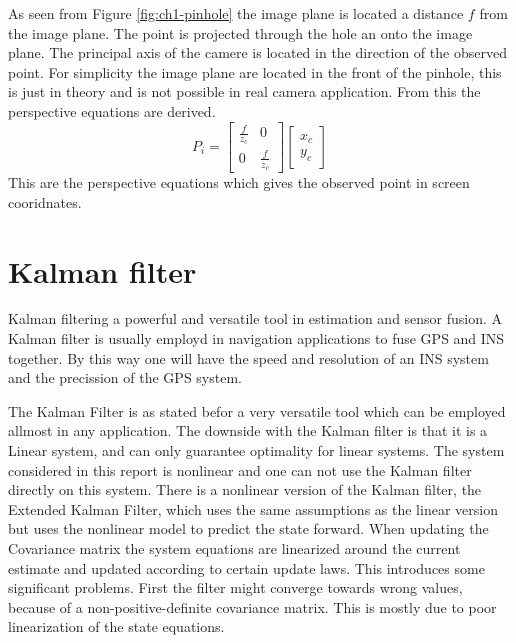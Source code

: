 	As seen from Figure \ref{fig:ch1-pinhole} the image plane is located a distance $f$ from the image plane. 
	The point is projected through the hole an onto the image plane. The principal axis of the camere is located
	in the direction of the observed point. For simplicity the image plane are located in the front of the
	pinhole, this is just in theory and is not possible in real camera application. From this the
	perspective equations are derived. \cite{robotbok}
	\begin{equation}
		\label{eq:ch1-perspective}
		P_i = \left[ \begin{array}{cc}
					\frac{f}{z_c} & 0 \\
					0	& \frac{f}{z_c} 
				\end{array} \right] 
				\left[ \begin{array}{c}
					x_c \\
					y_c
					\end{array} \right]
	\end{equation}
	This are the perspective equations which gives the observed point in screen cooridnates. 

\section{Kalman filter}
	Kalman filtering a powerful and versatile tool in estimation and sensor fusion. A Kalman filter is
	usually employd in navigation applications to fuse GPS and INS together. By this way one will have
	the speed and resolution of an INS system and the precission of the GPS system.
	

	The Kalman Filter is as stated befor a very versatile tool which can be employed allmost in
	any application. The downside with the Kalman filter is that it is a Linear system, and can only
	guarantee optimality for linear systems. The system considered in this report is nonlinear and one can not
	use the Kalman filter directly on this system. There is a nonlinear version of the Kalman filter, the
	Extended Kalman Filter, which uses the same assumptions as the linear version but uses the nonlinear
	model to predict the state forward. When updating the Covariance matrix the system equations are
	linearized around the current estimate and updated according to certain update laws. This introduces some
	significant problems. First the filter might converge towards wrong values, because of a non-positive-definite
	covariance matrix. This is mostly due to poor linearization of the state equations. \cite{kalman}
	
